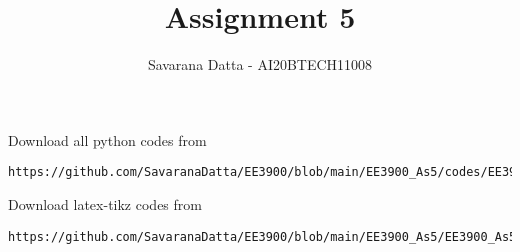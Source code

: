 \documentclass[journal,12pt,twocolumn]{IEEEtran}
\DeclareMathOperator*{\Res}{Res}
\begin{document}
\newcommand{\BEQA}{\begin{eqnarray}}
\newcommand{\EEQA}{\end{eqnarray}}
\newcommand{\define}{\stackrel{\triangle}{=}}

\raggedbottom
\setlength{\parindent}{0pt}
\providecommand{\mbf}{\mathbf}
\providecommand{\pr}[1]{\ensuremath{\Pr\left(#1\right)}}
\providecommand{\qfunc}[1]{\ensuremath{Q\left(#1\right)}}
\providecommand{\sbrak}[1]{\ensuremath{{}\left[#1\right]}}
\providecommand{\lsbrak}[1]{\ensuremath{{}\left[#1\right.}}
\providecommand{\rsbrak}[1]{\ensuremath{{}\left.#1\right]}}
\providecommand{\brak}[1]{\ensuremath{\left(#1\right)}}
\providecommand{\lbrak}[1]{\ensuremath{\left(#1\right.}}
\providecommand{\rbrak}[1]{\ensuremath{\left.#1\right)}}
\providecommand{\cbrak}[1]{\ensuremath{\left\{#1\right\}}}
\providecommand{\lcbrak}[1]{\ensuremath{\left\{#1\right.}}
\providecommand{\rcbrak}[1]{\ensuremath{\left.#1\right\}}}
\theoremstyle{remark}
\newtheorem{rem}{Remark}
\newcommand{\sgn}{\mathop{\mathrm{sgn}}}
\providecommand{\abs}[1]{\vert#1\vert}
\providecommand{\res}[1]{\Res\displaylimits_{#1}} 
\providecommand{\norm}[1]{\lVert#1\rVert}
\providecommand{\mtx}[1]{\mathbf{#1}}
\providecommand{\mean}[1]{E[ #1 ]}
\providecommand{\fourier}{\overset{\mathcal{F}}{ \rightleftharpoons}}
\providecommand{\system}{\overset{\mathcal{H}}{ \longleftrightarrow}}
\newcommand{\solution}{\noindent \textbf{Solution: }}
\newcommand{\cosec}{\,\text{cosec}\,}
\providecommand{\dec}[2]{\ensuremath{\overset{#1}{\underset{#2}{\gtrless}}}}
\newcommand{\myvec}[1]{\ensuremath{\begin{pmatrix}#1\end{pmatrix}}}
\newcommand{\mydet}[1]{\ensuremath{\begin{vmatrix}#1\end{vmatrix}}}
\makeatletter
{}
\makeatother
\let\StandardTheFigure\thefigure
\let\vec\mathbf
\renewcommand{\thefigure}{\theproblem}
\def\putbox#1#2#3{\makebox[0in][l]{\makebox[#1][l]{}\raisebox{\baselineskip}[0in][0in]{\raisebox{#2}[0in][0in]{#3}}}}
     \def\rightbox#1{\makebox[0in][r]{#1}}
     \def\centbox#1{\makebox[0in]{#1}}
     \def\topbox#1{\raisebox{-\baselineskip}[0in][0in]{#1}}
     \def\midbox#1{\raisebox{-0.5\baselineskip}[0in][0in]{#1}}
\vspace{3cm}
\title{Assignment 5}
\author{Savarana Datta - AI20BTECH11008}
\maketitle
\newpage
\bigskip
\renewcommand{\thefigure}{\theenumi}
\renewcommand{\thetable}{\theenumi}
Download all python codes from 
\begin{lstlisting}
https://github.com/SavaranaDatta/EE3900/blob/main/EE3900_As5/codes/EE3900_As5.py
\end{lstlisting}
%
Download latex-tikz codes from 
%
\begin{lstlisting}
https://github.com/SavaranaDatta/EE3900/blob/main/EE3900_As5/EE3900_As5.tex
\end{lstlisting}
\end{document}
